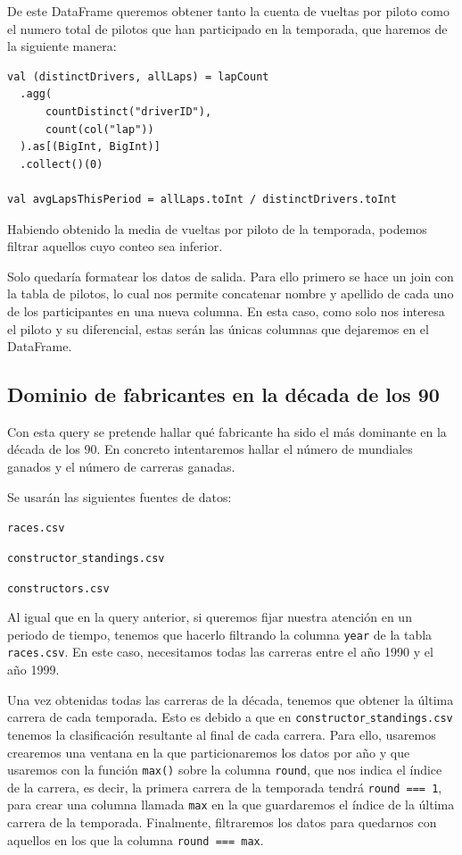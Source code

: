 \documentclass[12pt,twoside,titlepage]{report}
\begin{document}
De este DataFrame queremos obtener tanto la cuenta de vueltas por piloto como el numero total de pilotos que han participado en la temporada, que haremos de la siguiente manera:
\begin{lstlisting}
val (distinctDrivers, allLaps) = lapCount
  .agg(
      countDistinct("driverID"),
      count(col("lap"))
  ).as[(BigInt, BigInt)]
  .collect()(0)

val avgLapsThisPeriod = allLaps.toInt / distinctDrivers.toInt
\end{lstlisting}

Habiendo obtenido la media de vueltas por piloto de la temporada, podemos filtrar aquellos cuyo conteo sea inferior.


Solo quedaría formatear los datos de salida. Para ello primero se hace un join con la tabla de pilotos, lo cual nos permite concatenar nombre y apellido de cada uno de los participantes en una nueva columna. En esta caso, como solo nos interesa el piloto y su diferencial, estas serán las únicas columnas que dejaremos en el DataFrame.


\subsection{Dominio de fabricantes en la década de los 90}

Con esta query se pretende hallar qué fabricante ha sido el más dominante en la década de los 90. En concreto intentaremos hallar el número de mundiales ganados y el número de carreras ganadas.

Se usarán las siguientes fuentes de datos:
\begin{compactitem}
  \item \texttt{races.csv}
  \item \texttt{constructor$\_$standings.csv}
  \item \texttt{constructors.csv}
\end{compactitem}

Al igual que en la query anterior, si queremos fijar nuestra atención en un periodo de tiempo, tenemos que hacerlo filtrando la columna \texttt{year} de la tabla \texttt{races.csv}. En este caso, necesitamos todas las carreras entre el año 1990 y el año 1999.

Una vez obtenidas todas las carreras de la década, tenemos que obtener la última carrera de cada temporada. Esto es debido a que en \newline\texttt{constructor$\_$standings.csv} tenemos la clasificación resultante al final de cada carrera. Para ello, usaremos crearemos una ventana en la que particionaremos los datos por año y que usaremos con la función \texttt{max()} sobre la columna \texttt{round}, que nos indica el índice de la carrera, es decir, la primera carrera de la temporada tendrá \texttt{round === 1}, para crear una columna llamada \texttt{max} en la que guardaremos el índice de la última carrera de la temporada. Finalmente, filtraremos los datos para quedarnos con aquellos en los que la columna \texttt{round === max}.
\end{document}
